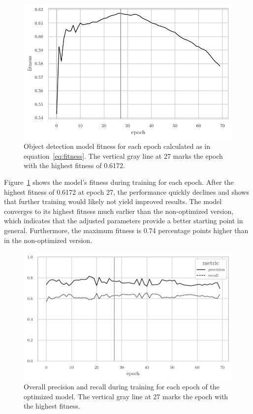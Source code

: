 \documentclass[draft,final]{vutinfth} %
\begin{document}
\begin{figure}
  \centering
  \includegraphics{graphics/model_fitness_final.pdf}
  \caption[Optimized object detection fitness per epoch.]{Object
    detection model fitness for each epoch calculated as in
    equation~\ref{eq:fitness}. The vertical gray line at \num{27}
    marks the epoch with the highest fitness of \num{0.6172}.}
  \label{fig:hyp-opt-fitness}
\end{figure}

Figure~\ref{fig:hyp-opt-fitness} shows the model's fitness during
training for each epoch. After the highest fitness of \num{0.6172} at
epoch \num{27}, the performance quickly declines and shows that
further training would likely not yield improved results. The model
converges to its highest fitness much earlier than the non-optimized
version, which indicates that the adjusted parameters provide a better
starting point in general. Furthermore, the maximum fitness is 0.74
percentage points higher than in the non-optimized version.

\begin{figure}
  \centering
  \includegraphics{graphics/precision_recall_final.pdf}
  \caption[Hyper-parameter optimized object detection precision and
  recall during training.]{Overall precision and recall during
    training for each epoch of the optimized model. The vertical gray
    line at \num{27} marks the epoch with the highest fitness.}
  \label{fig:hyp-opt-prec-rec}
\end{figure}
\end{document}
